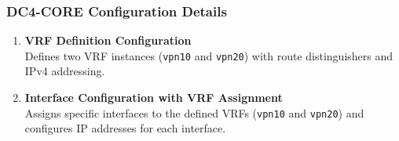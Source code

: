 \documentclass[12pt,english]{report}
\begin{document}
\subsubsection{DC4-CORE Configuration Details}
\begin{enumerate}
    \item \textbf{VRF Definition Configuration} \\
    Defines two VRF instances (\texttt{vpn10} and \texttt{vpn20}) with route distinguishers and IPv4 addressing.

    \item \textbf{Interface Configuration with VRF Assignment} \\
    Assigns specific interfaces to the defined VRFs (\texttt{vpn10} and \texttt{vpn20}) and configures IP addresses for each interface.
\end{enumerate}
\end{document}

